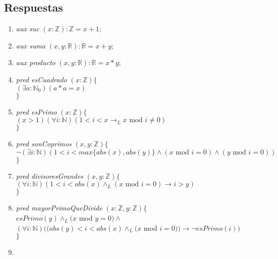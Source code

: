 \documentclass[a4paper]{article}
\begin{document}
\subsection*{Respuestas}

\begin{enumerate}[label=\alph*)]
\item \textit{aux suc} $(x: \mathbb{Z}):\mathbb{Z}=x+1;$ 
\item \textit{aux suma} $(x,y: \mathbb{R}):\mathbb{R}=x+y;$
\item \textit{aux producto} $(x,y: \mathbb{R}):\mathbb{R}=x*y;$
\item \textit{pred esCuadrado} $(x: \mathbb{Z})\{$\\ 
\hspace*{6mm}$(\exists a :\mathbb{N}_0)(a*a=x)$\\
$\}$
\item \textit{pred esPrimo} $(x: \mathbb{Z})\{$\\ 
\hspace*{6mm}$ (x > 1)(\forall i :\mathbb{N})(1<i<x \rightarrow _L x\textrm{ mod }i\neq 0 )$\\
$\}$
\item \textit{pred sonCoprimos} $(x,y: \mathbb{Z})\{$\\  
\hspace*{6mm}$ \neg (\exists i :\mathbb{N})(1<i<max\{abs(x),abs(y)\} \wedge (x\textrm{ mod }i=0)\wedge (y\textrm{ mod }i=0))$\\
$\}$
\item \textit{pred divisoresGrandes} $(x,y: \mathbb{Z})\{$\\
\hspace*{6mm}$ (\forall i :\mathbb{N})(1<i<abs(x) \wedge _L(x\textrm{ mod }i=0 ) \rightarrow  i>y)$\\
$\}$

\item \textit{pred mayorPrimoQueDivide} $(x: \mathbb{Z},y: \mathbb{Z})\{$\\
\hspace*{6mm}$esPrimo(y)\wedge _L (x $ mod $y=0)\wedge$\\
\hspace*{6mm}$(\forall i :\mathbb{N})((abs(y)<i<abs(x) \wedge _L(x $ mod $i =0)  )\rightarrow \neg esPrimo(i) )$\\
$\}$
\item
\end{enumerate}
\end{document}
